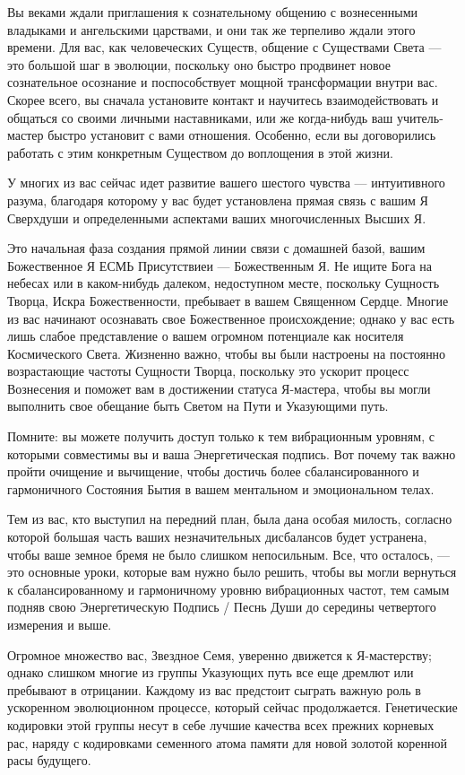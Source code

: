 Вы веками ждали приглашения к сознательному общению с вознесенными владыками и
ангельскими царствами, и они так же терпеливо ждали этого времени.  Для вас,
как человеческих Существ, общение с Существами Света — это большой шаг в
эволюции, поскольку оно быстро продвинет новое сознательное осознание и
поспособствует мощной трансформации внутри вас. Скорее всего, вы сначала
установите контакт и научитесь взаимодействовать и общаться со своими личными
наставниками, или же когда-нибудь ваш учитель-мастер быстро установит с вами
отношения. Особенно, если вы договорились работать с этим конкретным Существом
до воплощения в этой жизни.

У многих из вас сейчас идет развитие вашего шестого чувства — интуитивного
разума, благодаря которому у вас будет установлена прямая связь с вашим Я
Сверхдуши и определенными аспектами ваших многочисленных Высших Я.

 Это начальная фаза создания прямой линии связи с домашней базой, вашим
 Божественное Я ЕСМЬ Присутствиеи — Божественным Я. Не ищите Бога на небесах
 или в каком-нибудь далеком, недоступном месте, поскольку Сущность Творца,
 Искра Божественности, пребывает в вашем Священном Сердце. Многие из вас
 начинают осознавать свое Божественное происхождение; однако у вас есть лишь
 слабое представление о вашем огромном потенциале как носителя Космического
 Света. Жизненно важно, чтобы вы были настроены на постоянно возрастающие
 частоты Сущности Творца, поскольку это ускорит процесс Вознесения и поможет
 вам в достижении статуса Я-мастера, чтобы вы могли выполнить свое обещание
 быть Светом на Пути и Указующими путь.

Помните: вы можете получить доступ только к тем вибрационным уровням, с
которыми совместимы вы и ваша Энергетическая подпись. Вот почему так важно
пройти очищение и вычищение, чтобы достичь более сбалансированного и
гармоничного Состояния Бытия в вашем ментальном и эмоциональном телах.

Тем из вас, кто выступил на передний план, была дана особая милость, согласно
которой большая часть ваших незначительных дисбалансов будет устранена, чтобы
ваше земное бремя не было слишком непосильным. Все, что осталось, — это
основные уроки, которые вам нужно было решить, чтобы вы могли вернуться к
сбалансированному и гармоничному уровню вибрационных частот, тем самым подняв
свою Энергетическую Подпись / Песнь Души до середины четвертого измерения и
выше.

Огромное множество вас, Звездное Семя, уверенно движется к Я-мастерству; однако
слишком многие из группы Указующих путь все еще дремлют или пребывают в
отрицании. Каждому из вас предстоит сыграть важную роль в ускоренном
эволюционном процессе, который сейчас продолжается. Генетические кодировки этой
группы несут в себе лучшие качества всех прежних корневых рас, наряду с
кодировками семенного атома памяти для новой золотой коренной расы будущего. 

